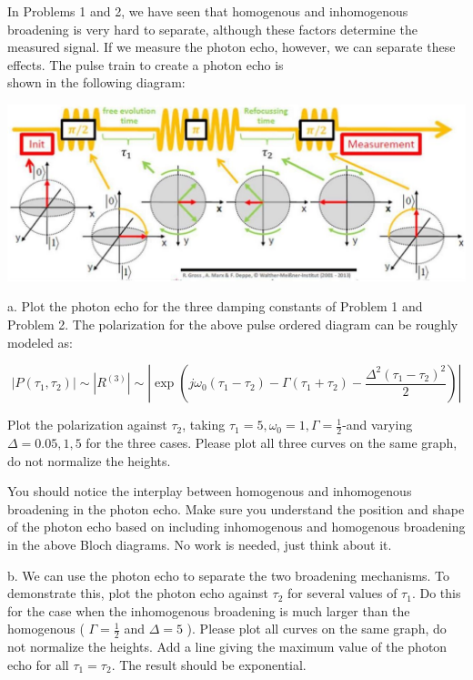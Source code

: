 \documentclass[12pt]{article}
\begin{document}
In Problems 1 and 2, we have seen that homogenous and inhomogenous broadening is very hard to separate, although these factors determine the measured signal. If we measure the photon echo, however, we can separate these effects. The pulse train to create a photon echo is\\
shown in the following diagram:

\begin{center}
\includegraphics[max width=\textwidth]{2024_05_19_b95480aad91fe1b645d5g-2}
\end{center}

a. Plot the photon echo for the three damping constants of Problem 1 and Problem 2. The polarization for the above pulse ordered diagram can be roughly modeled as:

$$
\left|P\left(\tau_{1}, \tau_{2}\right)\right| \sim\left|R^{(3)}\right| \sim\left|\exp \left(j \omega_{0}\left(\tau_{1}-\tau_{2}\right)-\Gamma\left(\tau_{1}+\tau_{2}\right)-\frac{\Delta^{2}\left(\tau_{1}-\tau_{2}\right)^{2}}{2}\right)\right|
$$

Plot the polarization against $\tau_{2}$, taking $\tau_{1}=5, \omega_{0}=1, \Gamma=\frac{1}{2}$-and varying $\Delta=0.05,1,5$ for the three cases. Please plot all three curves on the same graph, do not normalize the heights.

You should notice the interplay between homogenous and inhomogenous broadening in the photon echo. Make sure you understand the position and shape of the photon echo based on including inhomogenous and homogenous broadening in the above Bloch diagrams. No work is needed, just think about it.

b. We can use the photon echo to separate the two broadening mechanisms. To demonstrate this, plot the photon echo against $\tau_{2}$ for several values of $\tau_{1}$. Do this for the case when the inhomogenous broadening is much larger than the homogenous ( $\Gamma=\frac{1}{2}$ and $\Delta=5$ ). Please plot all curves on the same graph, do not normalize the heights. Add a line giving the maximum value of the photon echo for all $\tau_{1}=\tau_{2}$. The result should be exponential.
\end{document}
